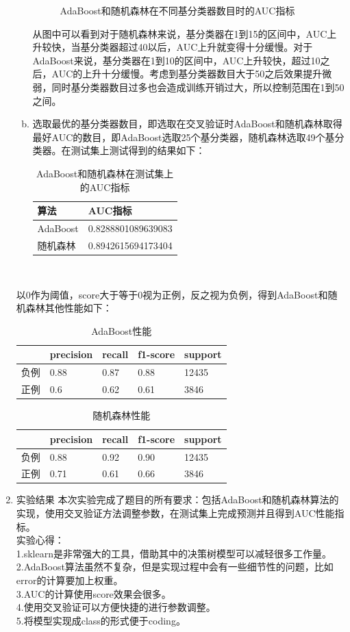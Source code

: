 \documentclass[a4paper,UTF8]{article}
\numberwithin{equation}{section}
\begin{document}
\begin{enumerate}[1.]
\begin{enumerate}[a.]
\begin{figure}[!ht]
	\caption{AdaBoost和随机森林在不同基分类器数目时的AUC指标}
	\label{fig:label}
\end{figure}
从图中可以看到对于随机森林来说，基分类器在1到15的区间中，AUC上升较快，当基分类器超过40以后，AUC上升就变得十分缓慢。对于AdaBoost来说，基分类器在1到10的区间中，AUC上升较快，超过10之后，AUC的上升十分缓慢。考虑到基分类器数目大于50之后效果提升微弱，同时基分类器数目过多也会造成训练开销过大，所以控制范围在1到50之间。
\item 选取最优的基分类器数目，即选取在交叉验证时AdaBoost和随机森林取得最好AUC的数目，即AdaBoost选取25个基分类器，随机森林选取49个基分类器。在测试集上测试得到的结果如下：
\begin{table}[!ht]
	\centering
	\caption{AdaBoost和随机森林在测试集上的AUC指标}
	\label{my-label}
	\begin{tabular}{|l|l|}
		\hline
	算法	& AUC指标 \\ \hline
	AdaBoost	& 0.8288801089639083 \\ \hline
	随机森林	&  0.8942615694173404\\ \hline
	\end{tabular}
\end{table}\\
\end{enumerate}
以0作为阈值，score大于等于0视为正例，反之视为负例，得到AdaBoost和随机森林其他性能如下：
\begin{table}[!h]
	\centering
	\caption{AdaBoost性能}
	\label{my-label2}
	\begin{tabular}{|l|l|l|l|l|}
		\hline
		& precision & recall & f1-score & support \\ \hline
	负例	& 0.88 & 0.87 & 0.88 & 12435 \\ \hline
	正例	& 0.6 & 0.62 & 0.61 & 3846 \\ \hline
	\end{tabular}
\end{table}
\begin{table}[!h]
	\centering
	\caption{随机森林性能}
	\label{my-label3}
	\begin{tabular}{|l|l|l|l|l|}
		\hline
		& precision & recall & f1-score & support \\ \hline
		负例	& 0.88 & 0.92 & 0.90 & 12435 \\ \hline
		正例	& 0.71 & 0.61 & 0.66 & 3846 \\ \hline
	\end{tabular}
\end{table}
\item 实验结果
本次实验完成了题目的所有要求：包括AdaBoost和随机森林算法的实现，使用交叉验证方法调整参数，在测试集上完成预测并且得到AUC性能指标。\\
实验心得：\\
1.sklearn是非常强大的工具，借助其中的决策树模型可以减轻很多工作量。\\
2.AdaBoost算法虽然不复杂，但是实现过程中会有一些细节性的问题，比如error的计算要加上权重。\\
3.AUC的计算使用score效果会很多。\\
4.使用交叉验证可以方便快捷的进行参数调整。\\
5.将模型实现成class的形式便于coding。
\end{enumerate}
	
\end{document}
